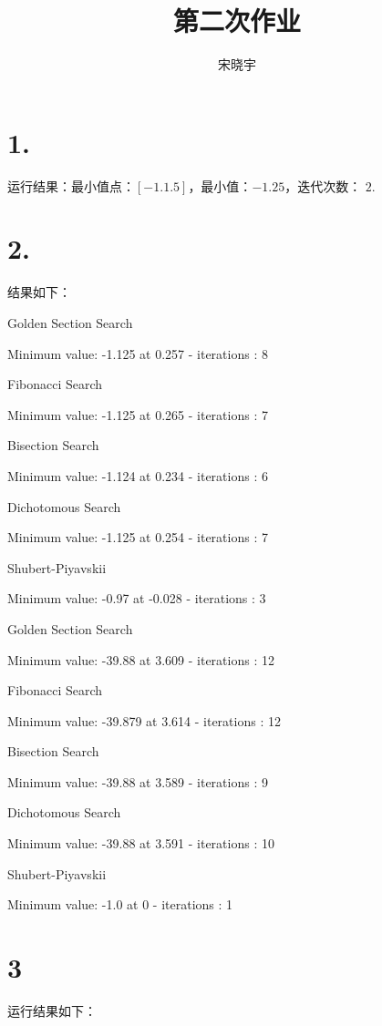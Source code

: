 \documentclass{article}
\title{\heiti 第二次作业}
\author{\kaishu 宋晓宇}
\date{}
\begin{document}
	\maketitle
	\section*{1.}

	运行结果：最小值点：$ [-1.   1.5] $，最小值：$-1.25$，迭代次数： $2$.
	
    \section*{2.}
	
    结果如下：

    Golden Section Search 
    
    Minimum value: -1.125 at 0.257 - iterations : 8

    Fibonacci Search 
    
    Minimum value: -1.125 at 0.265 - iterations : 7

    Bisection Search
    
    Minimum value: -1.124 at 0.234 - iterations : 6

    Dichotomous Search 
    
    Minimum value: -1.125 at 0.254 - iterations : 7

    Shubert-Piyavskii 
    
    Minimum value: -0.97 at -0.028 - iterations : 3

    Golden Section Search 
    
    Minimum value: -39.88 at 3.609 - iterations : 12
    
    Fibonacci Search 
    
    Minimum value: -39.879 at 3.614 - iterations : 12

Bisection Search

Minimum value: -39.88 at 3.589 - iterations : 9

Dichotomous Search 

Minimum value: -39.88 at 3.591 - iterations : 10

Shubert-Piyavskii 

Minimum value: -1.0 at 0 - iterations : 1


    \section*{3}

    运行结果如下：
\end{document}
